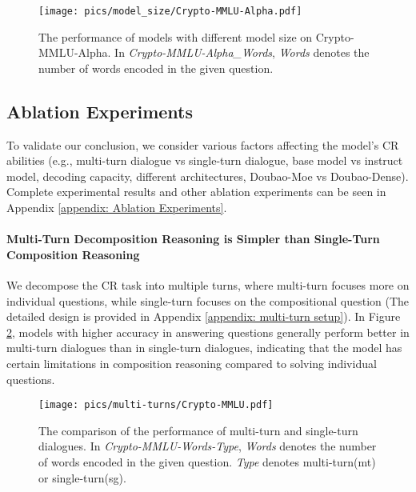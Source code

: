 \begin{figure}[h!]
    \centering
    \vskip 0.2in
    \texttt{[image: pics/model\_size/Crypto-MMLU-Alpha.pdf]}
    \caption{The performance of models with different model size on Crypto-MMLU-Alpha. In \textit{Crypto-MMLU-Alpha\_Words}, \textit{Words} denotes the number of words encoded in the given question.}
    \label{fig:model_size}
    \vskip -0.2in
\end{figure}

\subsection{Ablation Experiments}
\label{section: ablation experiments}
To validate our conclusion, we consider various factors affecting the model's CR abilities (e.g., multi-turn dialogue vs single-turn dialogue, base model vs instruct model, decoding capacity, different architectures, Doubao-Moe vs Doubao-Dense). Complete experimental results and other ablation experiments can be seen in Appendix \ref{appendix: Ablation Experiments}.

\paragraph{Multi-Turn Decomposition Reasoning is Simpler than Single-Turn Composition Reasoning}
We decompose the CR task into multiple turns, where multi-turn focuses more on individual questions, while single-turn focuses on the compositional question (The detailed design is provided in Appendix \ref{appendix: multi-turn setup}).
In Figure \ref{fig:multi-turns}, models with higher accuracy in answering questions generally perform better in multi-turn dialogues than in single-turn dialogues, indicating that the model has certain limitations in composition reasoning compared to solving individual questions.

\begin{figure}[ht!]
    \centering
    \vskip 0.2in
    \texttt{[image: pics/multi-turns/Crypto-MMLU.pdf]}
    \caption{The comparison of the performance of multi-turn and single-turn dialogues. In \textit{Crypto-MMLU-Words-Type}, \textit{Words} denotes the number of words encoded in the given question. \textit{Type} denotes multi-turn(mt) or single-turn(sg).}
    \label{fig:multi-turns}
    \vskip -0.2in
\end{figure}
\vspace{-10pt} 
